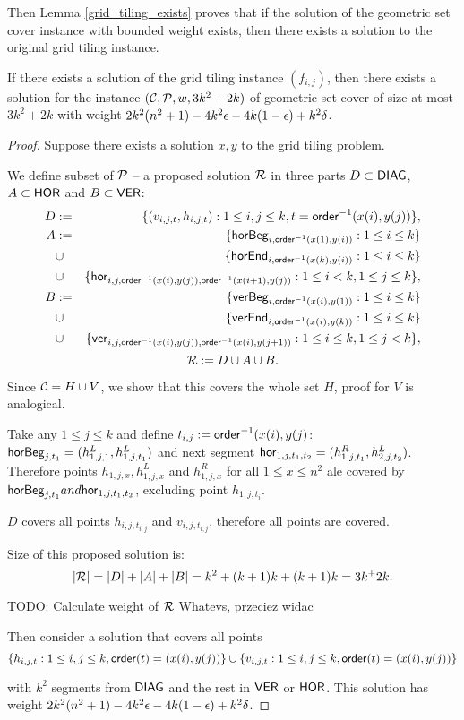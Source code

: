 Then Lemma \ref{grid_tiling_exists} proves that if the solution
of the geometric set cover instance with bounded weight exists,
then there exists a solution to the original grid tiling instance.

\begin{lemma}
\label{set_cover_solution_exists}
	If there exists a solution of the grid tiling instance $(f_{i,j})$,
	then there exists a solution for the instance $(\mathcal{C}, \mathcal{P}, w, 3k^2+2k)$
	of geometric set cover of size at most $3k^2+2k$
	with weight $2k^2(n^2+1) - 4k^2\epsilon -4k(1-\epsilon) +k^2\delta$.
\end{lemma}

\begin{proof}
Suppose there exists a solution $x,y$ to the grid tiling problem.
	
We define subset of $\mathcal{P}$ -- a proposed solution $\mathcal{R}$
in three parts $D \subset \mathsf{DIAG}$, $A \subset \mathsf{HOR}$ and $B \subset \mathsf{VER}$:
\begin{eqnarray*}
	D & := & \{(v_{i, j, t}, h_{i, j, t}) : 1 \le i, j \le k, t = \mathsf{order}^{-1}(x(i), y(j))\}, \\
	A & := & \{\mathsf{horBeg}_{i,\mathsf{order}^{-1}(x(1), y(i))} : 1 \le i \le k\} \\
	& \cup & \{\mathsf{horEnd}_{i,\mathsf{order}^{-1}(x(k), y(i))} : 1 \le i \le k\} \\
	& \cup & \{\mathsf{hor}_{i,j,\mathsf{order}^{-1}(x(i), y(j)),\mathsf{order}^{-1}(x(i+1), y(j))} : 1 \le i < k, 1 \le j \le k\}, \\
	B & := & \{\mathsf{verBeg}_{i,\mathsf{order}^{-1}(x(i), y(1))} : 1 \le i \le k\} \\
	& \cup & \{\mathsf{verEnd}_{i,\mathsf{order}^{-1}(x(i), y(k))} : 1 \le i \le k\} \\
	& \cup & \{\mathsf{ver}_{i,j,\mathsf{order}^{-1}(x(i), y(j)),\mathsf{order}^{-1}(x(i), y(j+1))} : 1 \le i \le k, 1 \le j < k\},
\end{eqnarray*}
	$$\mathcal{R} := D \cup A \cup B.$$

Since $\mathcal{C} = H \cup V$, we show that this covers the whole set $H$,
proof for $V$ is analogical.

Take any $1 \le j \le k$ and define $t_{i,j} := \mathsf{order}^{-1}(x(i), y(j)$:
$\mathsf{horBeg}_{j,t_1} = (h_{1,j,1}^L, h_{1, j, t_1}^L)$ and next segment
$\mathsf{hor}_{1,j,t_1,t_2} = (h_{1,j, t_1}^R, h_{2,j,t_2}^L)$.
Therefore points $h_{1,j,x}, h_{1,j,x}^L$ and $h_{1,j,x}^R$
for all $1 \le x \le n^2$ ale covered by $\mathsf{horBeg}_{j,t_1} and \mathsf{hor}_{1,j,t_1,t_2}$,
excluding point $h_{1,j,t_i}$.

$D$ covers all points $h_{i,j, t_{i,j}}$ and $v_{i,j, t_{i,j}}$, therefore
all points are covered.

Size of this proposed solution is:
$$|\mathcal{R}| = |D| + |A| + |B| = k^2 + (k+1)k + (k+1)k = 3k^+2k.$$

TODO: Calculate weight of $\mathcal{R}$
Whatevs, przeciez widac
	
Then consider a solution that covers
all points
$$\{h_{i, j, t} : 1 \le i, j \le k, \mathsf{order}(t)=(x(i), y(j))\}
\cup \{v_{i, j, t} : 1 \le i, j \le k, \mathsf{order}(t)=(x(i), y(j))\}$$

with $k^2$ segments from $\mathsf{DIAG}$
and the rest in $\mathsf{VER}$ or $\mathsf{HOR}$.
This solution has weight $2k^2(n^2+1) - 4k^2\epsilon -4k(1-\epsilon) +k^2\delta$.
\end{proof}


